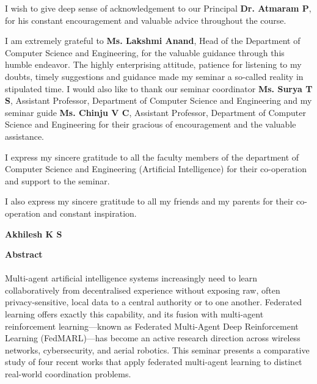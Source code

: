 \documentclass[12pt,a4paper,final]{extreport}
\begin{document}
I wish to give deep sense of acknowledgement to our Principal \textbf{Dr. Atmaram P}, for his constant encouragement and valuable advice throughout the course.

I am extremely grateful to \textbf{Ms. Lakshmi Anand}, Head of the Department of Computer Science and Engineering, for the valuable guidance through this humble endeavor. The highly enterprising attitude, patience for listening to my doubts, timely suggestions and guidance made my seminar a so-called reality in stipulated time.
I would also like to thank our seminar coordinator \textbf{Ms. Surya T S}, Assistant Professor, Department of Computer Science and Engineering and my seminar guide \textbf{Ms. Chinju V C}, Assistant Professor, Department of Computer Science and Engineering for their gracious of encouragement and the valuable assistance.

I express my sincere gratitude to all the faculty members of the department of Computer Science and Engineering (Artificial Intelligence) for their co-operation and support to the seminar.

I also express my sincere gratitude to all my friends and my parents for their co-operation and constant inspiration.

\vspace{2cm}
\noindent\hfill
\begin{minipage}[t]{0.4\textwidth}
\centering
\textbf{Akhilesh K S}
\end{minipage}

\newpage

\begin{center}
\begin{huge}
\textbf{Abstract}
\end{huge}
\end{center}

\vskip0.3cm

\begingroup
{}
\paragraph{} Multi-agent artificial intelligence systems increasingly need to learn collaboratively from decentralised experience without exposing raw, often privacy-sensitive, local data to a central authority or to one another. Federated learning offers exactly this capability, and its fusion with multi-agent reinforcement learning---known as Federated Multi-Agent Deep Reinforcement Learning (FedMARL)---has become an active research direction across wireless networks, cybersecurity, and aerial robotics. This seminar presents a comparative study of four recent works that apply federated multi-agent learning to distinct real-world coordination problems.
\end{document}

